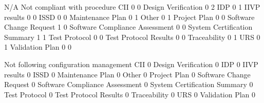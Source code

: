 \documentclass{article}
\begin{document}
\begin{Schunk}
\begin{Soutput}
                                 N/A Not compliant with procedure
  CII                              0                            0
  Design Verification              0                            2
  IDP                              0                            1
  IIVP results                     0                            0
  ISSD                             0                            0
  Maintenance Plan                 0                            1
  Other                            0                            1
  Project Plan                     0                            0
  Software Change Request          1                            0
  Software Compliance Assessment   0                            0
  System Certification Summary     1                            1
  Test Protocol                    0                            0
  Test Protocol Results            0                            0
  Traceability                     0                            1
  URS                              0                            1
  Validation Plan                  0                            0

                                 Not following configuration management
  CII                                                                 0
  Design Verification                                                 0
  IDP                                                                 0
  IIVP results                                                        0
  ISSD                                                                0
  Maintenance Plan                                                    0
  Other                                                               0
  Project Plan                                                        0
  Software Change Request                                             0
  Software Compliance Assessment                                      0
  System Certification Summary                                        0
  Test Protocol                                                       0
  Test Protocol Results                                               0
  Traceability                                                        0
  URS                                                                 0
  Validation Plan                                                     0


\end{Soutput}
\end{Schunk}
\end{document}
